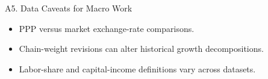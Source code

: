 \documentclass[aspectratio=169,10pt]{beamer}
\begin{document}
\begin{frame}{A5. Data Caveats for Macro Work}
\hypertarget{apx-caveats}{}
\begin{itemize}
  \item PPP versus market exchange-rate comparisons.
  \item Chain-weight revisions can alter historical growth decompositions.
  \item Labor-share and capital-income definitions vary across datasets.
\end{itemize}
\end{frame}
\end{document}
